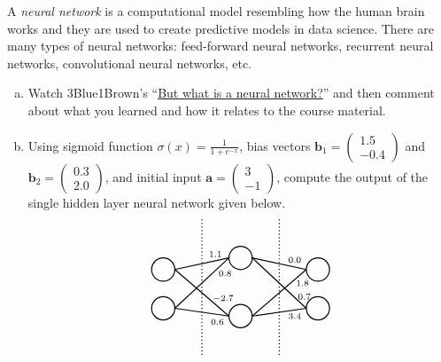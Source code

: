 \documentclass[11pt,letterpaper]{article}
\begin{document}
 A \textit{neural network} is a computational model resembling how the human brain works and they are used to create predictive models in data science. There are many types of neural networks: feed-forward neural networks, recurrent neural networks, convolutional neural networks, etc. 
	\begin{enumerate}[(a)]
	\item Watch 3Blue1Brown's ``\href{https://www.youtube.com/watch?v=aircAruvnKk&list=PLZHQObOWTQDNU6R1_67000Dx_ZCJB-3pi&ab_channel=3Blue1Brown}{But what is a neural network?}'' and then comment about what you learned and how it relates to the course material. 
	\item Using sigmoid function $\sigma(x)= \frac{1}{1 + e^{-x}}$, bias vectors $\mathbf{b}_1= \begin{pmatrix} 1.5 \\ -0.4 \end{pmatrix}$ and $\mathbf{b}_2= \begin{pmatrix} 0.3 \\ 2.0 \end{pmatrix}$, and initial input $\mathbf{a}= \begin{pmatrix} 3 \\ -1 \end{pmatrix}$, compute the output of the single hidden layer neural network given below. 
		\[
		\begin{tikzpicture}[scale=1.1]
		\draw[line width=0.03cm] (0,0.2) circle (0.3);
		\draw[line width=0.03cm] (0,1.2) circle (0.3);
		\draw[line width=0.03cm] (2,0) circle (0.3);
		\draw[line width=0.03cm] (2,1.5) circle (0.3);
		\draw[line width=0.03cm] (4,0.2) circle (0.3);
		\draw[line width=0.03cm] (4,1.2) circle (0.3);
		
		\draw[line width=0.03cm,dotted] (1,-1) -- (1,2.5);
		\draw[line width=0.03cm,dotted] (3,-1) -- (3,2.5);
		
		\draw[line width=0.03cm] (0.3,1.2) -- (1.7,1.5);
		\draw[line width=0.03cm] (0.3,1.2) -- (1.7,0);
		\draw[line width=0.03cm] (0.3,0.2) -- (1.7,1.5);
		\draw[line width=0.03cm] (0.3,0.2) -- (1.7,0);
		
		\draw[line width=0.03cm] (2.3,1.5) -- (3.7,1.2);
		\draw[line width=0.03cm] (2.3,1.5) -- (3.7,0.2);
		\draw[line width=0.03cm] (2.3,0) -- (3.7,1.2);
		\draw[line width=0.03cm] (2.3,0) -- (3.7,0.2);
		
		\node at (1.35,1.6) {\scriptsize$1.1$};
		\node at (1.6,1.1) {\scriptsize$0.8$};
		\node at (1.55,0.45) {\scriptsize$-2.7$};
		\node at (1.4,-0.15) {\scriptsize$0.6$};
		
		\node at (3.4,1.45) {\scriptsize$0.0$};
		\node at (3.6,0.85) {\scriptsize$1.8$};
		\node at (3.65,0.5) {\scriptsize$0.7$};
		\node at (3.4,0) {\scriptsize$3.4$};
		\end{tikzpicture}
		\]
	\end{enumerate}
\end{document}
